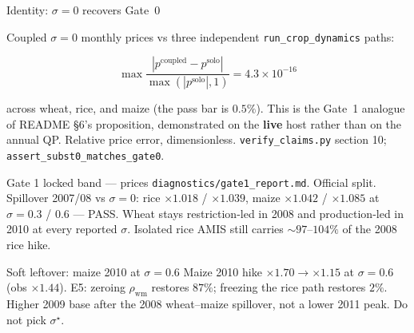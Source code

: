 \begin{frame}{Identity: $\sigma=0$ recovers Gate~0}

Coupled $\sigma=0$ monthly prices vs three independent
\texttt{run\_crop\_dynamics} paths:

\[
\max \frac{|p^{\mathrm{coupled}}-p^{\mathrm{solo}}|}{\max(|p^{\mathrm{solo}}|,1)}
= 4.3\times 10^{-16}
\]

across wheat, rice, and maize (the pass bar is $0.5\%$). This is the
Gate~1 analogue of README \S6's proposition, demonstrated on the
\textbf{live} host rather than on the annual QP.
{Relative price error, dimensionless.}
{\texttt{verify\_claims.py} section 10; \texttt{assert\_subst0\_matches\_gate0}.}
\end{frame}

\begin{frame}{Gate 1 locked band --- prices}
{\scriptsize \texttt{diagnostics/gate1\_report.md}. Official split.
Spillover 2007/08 vs $\sigma=0$: rice $\times 1.018$ / $\times 1.039$,
maize $\times 1.042$ / $\times 1.085$ at $\sigma=0.3$ / $0.6$ --- PASS.
Wheat stays restriction-led in 2008 and production-led in 2010 at every
reported $\sigma$. Isolated rice AMIS still carries $\sim 97$--$104\%$ of
the 2008 rice hike.}
\end{frame}

\begin{frame}{Soft leftover: maize 2010 at $\sigma=0.6$}
{\scriptsize Maize 2010 hike $\times 1.70\to\times 1.15$ at $\sigma=0.6$
(obs $\times 1.44$). E5: zeroing $\rho_{\mathrm{wm}}$ restores $87\%$;
freezing the rice path restores $2\%$. Higher 2009 base after the 2008
wheat--maize spillover, not a lower 2011 peak. Do not pick $\sigma^\star$.}
\end{frame}

